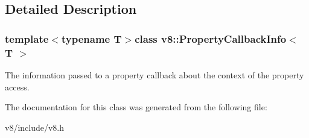 \subsection{Detailed Description}
\subsubsection*{template$<$typename T$>$class v8\-::\-Property\-Callback\-Info$<$ T $>$}

The information passed to a property callback about the context of the property access. 

The documentation for this class was generated from the following file\-:\begin{DoxyCompactItemize}
\item 
v8/include/v8.\-h\end{DoxyCompactItemize}
